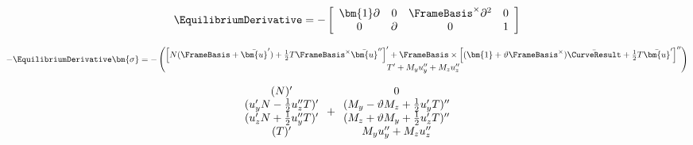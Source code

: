 \begin{equation*}
\EquilibriumDerivative = 
-\left[\begin{array}{cccc}
\bm{1}\partial & 0 & \FrameBasis^{\times}\partial^2 & 0\\
0 & \partial & 0 & 1
\end{array}\right]
\end{equation*}

$$
\begin{aligned}
- \EquilibriumDerivative\bm{\sigma}
&= 
-\begin{pmatrix}
\left[N (\FrameBasis + \bar{\bm{u}}') + \frac{1}{2}T\FrameBasis^\times \bar{\bm{u}}'' \right]' 
+ \FrameBasis\times\left[(\bm{1}+\vartheta\FrameBasis^{\times}) \bar{\CurveResult} + \frac{1}{2}T \bar{\bm{u}}' \right]''\\
T' + M_{\FrameYi} u_{\FrameYi}^{\prime\prime} + M_{\FrameZi} u_{\FrameZi}^{\prime\prime} \\ 
\end{pmatrix} \\
\end{aligned}
$$

$$
\begin{array}{c}
(N)^{\prime} \\
(u_{y}^{\prime} N - \frac{1}{2} u_{z}^{\prime\prime} T)^{\prime} \\
(u_{z}^{\prime} N + \frac{1}{2} u_{y}^{\prime\prime} T)^{\prime} \\
(T)^{\prime} \\
\end{array}
+
\begin{array}{c}
0 \\
( M_{y}-\vartheta M_{z} + \frac{1}{2}u_{y}^{\prime} T)'' \\
( M_{z}+\vartheta M_{y} + \frac{1}{2}u_{z}^{\prime} T)'' \\
M_{y} u_{y}^{\prime\prime} + M_{z} u_{z}^{\prime\prime}
\end{array}
$$

